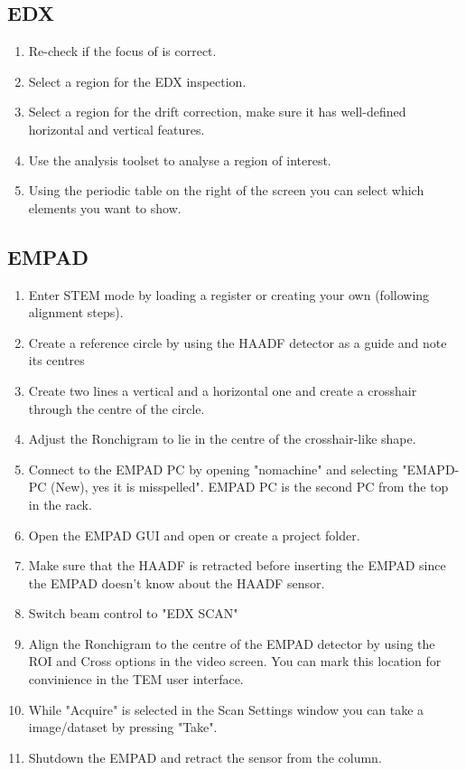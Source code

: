 \documentclass[a4paper]{scrartcl}
\begin{document}
\subsection*{EDX}
\begin{enumerate}
    \item Re-check if the focus of is correct.
    \item Select a region for the EDX inspection.
    \item Select a region for the drift correction, make sure it has well-defined horizontal and vertical features.
    \item Use the analysis toolset to analyse a region of interest.
    \item Using the periodic table on the right of the screen you can select which elements you want to show.
\end{enumerate}

\subsection*{EMPAD}
\begin{enumerate}
    \item Enter STEM mode by loading a register or creating your own (following alignment steps).
    \item Create a reference circle by using the HAADF detector as a guide and note its centres
    \item Create two lines a vertical and a horizontal one and create a crosshair through the centre of the circle.
    \item Adjust the Ronchigram to lie in the centre of the crosshair-like shape.
    \item Connect to the EMPAD PC by opening "nomachine" and selecting "EMAPD-PC (New), yes it is misspelled". EMPAD PC is the second PC from the top in the rack.
    \item Open the EMPAD GUI and open or create a project folder.
    \item Make sure that the HAADF is retracted before inserting the EMPAD since the EMPAD doesn't know about the HAADF sensor.
    \item Switch beam control to "EDX SCAN"
    \item Align the Ronchigram to the centre of the EMPAD detector by using the ROI and Cross options in the video screen. You can mark this location for convinience in the TEM user interface.
    \item While "Acquire" is selected in the Scan Settings window you can take a image/dataset by pressing "Take".
    \item Shutdown the EMPAD and retract the sensor from the column.
\end{enumerate}
\end{document}
